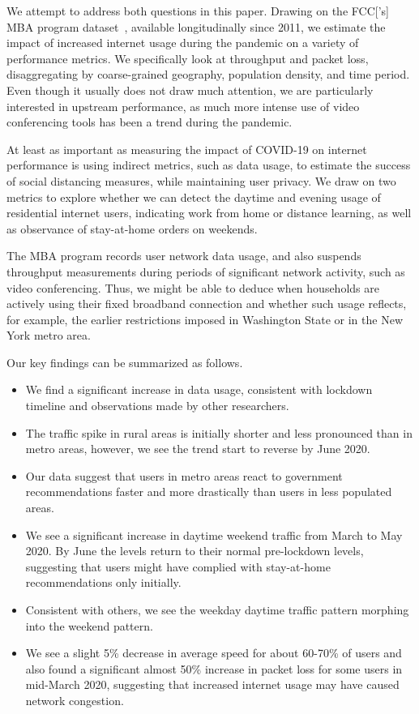 \documentclass[conference,10pt]{IEEEtran}
\begin{document}
We attempt to address both questions in this paper. Drawing on the \gls{FCC}['s] \gls{MBA} program dataset~\cite{mba}, available longitudinally since 2011, we estimate the impact of increased internet usage during the pandemic on a variety of performance metrics. We specifically look at throughput and packet loss, disaggregating by coarse-grained geography, population density, and time period. Even though it usually does not draw much attention, we are particularly interested in upstream performance, as much more intense use of video conferencing tools has been a trend during the pandemic.

At least as important as measuring the impact of COVID-19 on internet performance is using indirect metrics, such as data usage, to estimate the success of social distancing measures, while maintaining user privacy. We draw on two metrics to explore whether we can detect the daytime and evening usage of residential internet users, indicating work from home or distance learning, as well as observance of stay-at-home orders on weekends.

The \gls{MBA} program records user network data usage, and also suspends throughput measurements during periods of significant network activity, such as video conferencing. Thus, we might be able to deduce when households are actively using their fixed broadband connection and whether such usage reflects, for example, the earlier restrictions imposed in Washington State or in the New York metro area.

Our key findings can be summarized as follows.
\begin{itemize}
    \item We find a significant increase in data usage, consistent with lockdown timeline and observations made by other researchers.
    \item The traffic spike in rural areas is initially shorter and less pronounced than in metro areas, however, we see the trend start to reverse by June 2020.
    \item Our data suggest that users in metro areas react to government recommendations faster and more drastically than users in less populated areas.
    \item We see a significant increase in daytime weekend traffic from March to May 2020. By June the levels return to their normal pre-lockdown levels, suggesting that users might have complied with stay-at-home recommendations only initially.
    \item Consistent with others, we see the weekday daytime traffic pattern morphing into the weekend pattern.
    \item We see a slight 5\% decrease in average speed for about 60-70\% of users and also found a significant almost 50\% increase in packet loss for some users in mid-March 2020, suggesting that increased internet usage may have caused network congestion.
\end{itemize}
\end{document}
